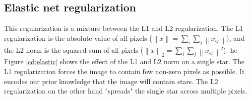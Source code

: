\subsection{Elastic net regularization} \label{cd:reg}
This regularization is a mixture between the L1 and L2 regularization.  The L1 regularization is the absolute value of all pixels ($\left \| x \right \| = \sum_i \sum_j \left \| x_{ij} \right \|$), and the L2 norm is the squared sum of all pixels ($\left \| x \right \|_2 = \sum_i \sum_j \left \| x_{ij} \right \|^2$). he Figure \ref{cd:elastic} shows the effect of the L1 and L2 norm on a single star. The L1 regularization forces the image to contain few non-zero pixels as possible. It encodes our prior knowledge that the image will contain stars. The L2 regularization on the other hand "spreads" the single star across multiple pixels. 

